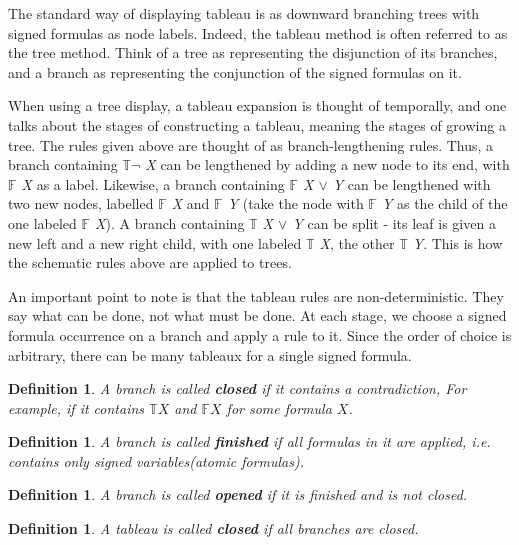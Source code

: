 \documentclass{article}
\newcommand\ST{\mathbb{T}}
\newcommand\SF{\mathbb{F}}
\newtheorem{defn}[theorem]{Definition}
\begin{document}
	\par
	The standard way of displaying tableau is as downward branching trees with signed formulas as node labels. Indeed, the tableau method is often referred to as the tree method. Think of a tree as representing the disjunction of its branches, and a branch as representing the conjunction of the signed formulas on it.

	\par
	When using a tree display, a tableau expansion is thought of temporally, and one talks about the stages of constructing a tableau, meaning the stages of growing a tree. The rules given above are thought of as branch-lengthening rules. Thus, a branch containing \textit{$\ST \neg$ X} can be lengthened by adding a new node to its end, with \textit{$\SF$ X} as a label. Likewise, a branch containing \textit{$\SF$ X $\lor$ Y} can be lengthened with two new nodes, labelled \textit{$\SF$ X} and \textit{$\SF$ Y} (take the node with \textit{$\SF$ Y} as the child of the one labeled \textit{$\SF$ X}). A branch containing \textit{$\ST$ X $\lor$ Y} can be split - its leaf is given a new left and a new right child, with one labeled \textit{$\ST$ X}, the other \textit{$\ST$ Y}. This is how the schematic rules above are applied to trees.
	\par
	An important point to note is that the tableau rules are non-deterministic. They say what can be done, not what must be done. At each stage, we choose a signed formula occurrence on a branch and apply a rule to it. Since the order of choice is arbitrary, there can be many tableaux for a single signed formula.

	\begin{defn}
		A branch is called \textbf{closed} if it contains a contradiction, For example, if it contains $\ST X$ and $\SF X$ for some formula $X$.
	\end{defn}

	\begin{defn}
		A branch is called \textbf{finished} if all formulas in it are applied, i.e. contains only signed variables(atomic formulas).
	\end{defn}

	\begin{defn}
		A branch is called \textbf{opened} if it is finished and is not closed.
	\end{defn}

	\begin{defn}
		A tableau is called \textbf{closed} if all branches are closed.
	\end{defn}
\end{document}
